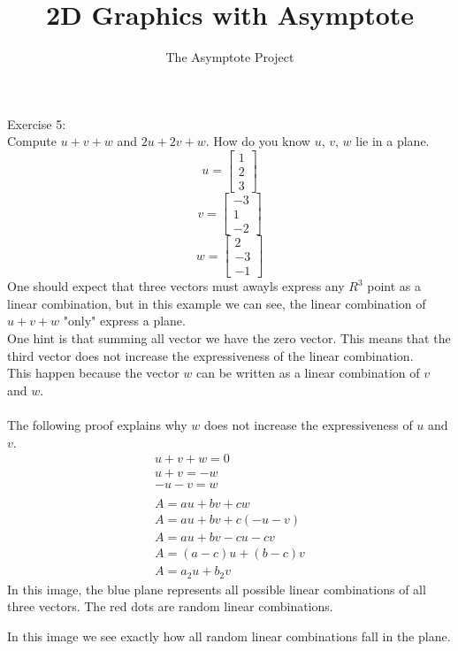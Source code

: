\documentclass[12pt]{article}
\title{2D Graphics with Asymptote}
\author{The Asymptote Project}
\newcommand{\insertrep}[1]{%
	\hspace*{-2.4cm}
	\fbox{\texttt{[image: \#1]}}
}
\begin{document}
Exercise 5:\\
Compute $u+v+w$ and $2u+2v+w$. How do you know $u$, $v$, $w$ lie in a plane.\\
$$u = \begin{bmatrix}1\\2\\3\end{bmatrix}$$
$$v = \begin{bmatrix}-3\\1\\-2\end{bmatrix}$$
$$w = \begin{bmatrix}2\\-3\\-1\end{bmatrix}$$
One should expect that three vectors must awayls express any $R^3$ point as a linear combination, but in this example we can see, the linear combination of $u+v+w$ "only" express a plane.\\
One hint is that summing all vector we have the zero vector. This means that the third vector does not increase the expressiveness of the linear combination.\\
This happen because the vector $w$ can be written as a linear combination of $v$ and $w$.\\
\\
The following proof explains why $w$ does not increase the expressiveness of $u$ and $v$.
\begin{align*}
	u+v+w=0\\
	u+v=-w\\
	-u-v=w\\
	\\
	A = au + bv + cw\\
	A = au + bv + c(-u-v)\\
	A = au + bv - cu- cv\\	
	A = (a-c)u + (b-c)v\\
	A = a_2u + b_2v
\end{align*}
\newpage
In this image, the blue plane represents all possible linear combinations of all three vectors. The red dots are random linear combinations.
\begin{center}
	\insertrep{exercise01005a.pdf}
\end{center}
\newpage
In this image we see exactly how all random linear combinations fall in the plane.
\begin{center}
	\insertrep{exercise01005b.pdf}
\end{center}
\end{document}
